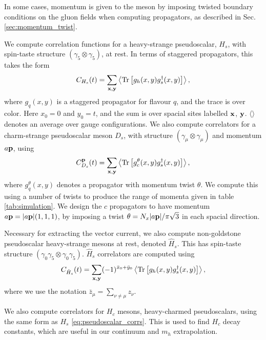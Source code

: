 In some cases, momentum is given to the meson by imposing twisted boundary conditions on the gluon fields when computing propagators, as described in Sec. \ref{sec:momentum_twist}.


We compute correlation functions for a heavy-strange pseudoscalar, $H_s$, with spin-taste structure $(\gamma_5\otimes \gamma_5)$, at rest. In terms of staggered propagators, this takes the form
\begin{align}
  C_{H_s}(t) = \sum_{\bf{x},\bf{y}} \left\langle \text{Tr}\left[ g_h(x,y) g_s^{\dagger}(x,y) \right] \right\rangle,
  \label{eq:pseudoscalar_corrs}
\end{align}
where $g_q(x,y)$ is a staggered propagator for flavour $q$, and the trace is over color. Here $x_0=0$ and $y_0=t$, and the sum is over spacial sites labelled {$\bf{x}$, $\bf{y}$}. $\langle \rangle$ denotes an average over gauge configurations. We also compute correlators for a charm-strange pseudoscalar meson $D_s$, with structure $(\gamma_{\mu}\otimes \gamma_{\mu})$ and momentum ${a\bf{p}}$, using
\begin{align}
  C^{\bf{p}}_{D_s}(t) = \sum_{\bf{x},\bf{y}} \left\langle \text{Tr}\left[ g^{\theta}_c(x,y) g_s^{\dagger}(x,y) \right] \right\rangle,
\end{align}
where $g_q^{\theta}(x,y)$ denotes a propagator with momentum twist $\theta$. We compute this using a number of twists to produce the range of momenta given in table \ref{tab:simulation}. We design the $c$ propagators to have momentum $a{\bf{p}} = |a{\bf{p}}|(1,1,1)$, by imposing a twist $\theta = N_x |a{\bf{p}}| / \pi \sqrt{3}$ in each spacial direction.

Necessary for extracting the vector current, we also compute non-goldstone pseudoscalar heavy-strange mesons at rest, denoted $\hat{H}_s$. This has spin-taste structure $(\gamma_0\gamma_5\otimes \gamma_0\gamma_5)$. $\hat{H}_s$ correlators are computed using
\begin{align}
  C_{\hat{H}_s}(t) = \sum_{\bf{x},\bf{y}}(-1)^{\bar{x}_0+\bar{y}_0} \left\langle \text{Tr}\left[ g_h(x,y) g^{\dagger}_s(x,y) \right] \right\rangle,
\end{align}
where we use the notation $\bar{z}_{\mu} = \sum_{\nu\neq\mu} z_{\nu}$.

We also compute correlators for $H_c$ mesons, heavy-charmed pseudoscalars, using the same form as $H_s$ \eqref{eq:pseudoscalar_corrs}. This is used to find $H_c$ decay constants, which are useful in our continuum and $m_h$ extrapolation.


